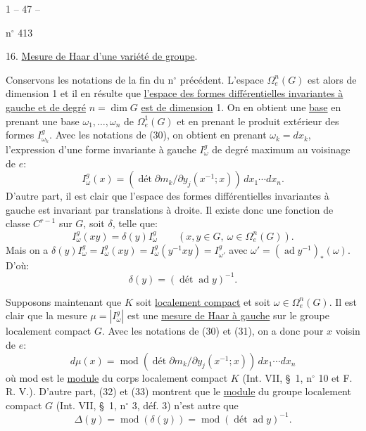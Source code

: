 \begin{center}1 -- 47 --\end{center}\hfill n$^\circ$ 413

16. \uline{Mesure de Haar d'une variété de groupe}.

Conservons les notations de la fin du n$^\circ$ précédent.
L'espace $\Omega_e^n(G)$ est alors de dimension 1 et il en résulte que \uline{l'espace des formes différentielles invariantes à gauche et de degré} $n=\dim G$ \uline{est de dimension} 1.
On en obtient une \uline{base} en prenant une base $\omega_1,\ldots,\omega_n$ de $\Omega_e^1(G)$ et en prenant le produit extérieur des formes $I_{\omega_k}^g$.
Avec les notations de (30), on obtient en prenant $\omega_k=dx_k$, l'expression d'une forme invariante à gauche $I_\omega^g$ de degré maximum au voisinage de $e$:
\[
\tag{31}I_\omega^g(x)=(\operatorname{dét}\partial m_k/\partial y_j(x^{-1};x))\,dx_1\cdots dx_n.
\]
D'autre part, il est clair que l'espace des formes différentielles invariantes à gauche est invariant par translations à droite.
Il existe donc une fonction de classe $C^{r-1}$ sur $G$, soit $\delta$, telle que:
\[
\tag{32}I_\omega^g(xy)=\delta(y)I_\omega^g\qquad(x,y\in G,\ \omega\in\Omega_e^n(G)).
\]
Mais on a $\delta(y)I_\omega^g=I_\omega^g(xy)=I_\omega^g(y^{-1}xy)=I_{\omega'}^g$ avec $\omega'=(\operatorname{ad}y^{-1})_*(\omega)$.
D'où:
\[
\tag{33}\delta(y)=(\operatorname{dét}\operatorname{ad}y)^{-1}.
\]

Supposons maintenant que $K$ soit \uline{localement compact} et soit $\omega\in\Omega_e^n(G)$.
Il est clair que la mesure $\mu=|I_\omega^g|$ est une \uline{mesure de Haar à gauche} sur le groupe localement compact $G$.
Avec les notations de (30) et (31), on a donc pour $x$ voisin de $e$:
\[
\tag{34}d\mu(x)=\operatorname{mod}(\operatorname{dét}\partial m_k/\partial y_j(x^{-1};x))\,dx_1\cdots dx_n
\]
où mod est le \uline{module} du corps localement compact $K$ (Int. VII, \S\ 1, n$^\circ$ 10 et F. R. V.).
D'autre part, (32) et (33) montrent que le \uline{module} du groupe localement compact $G$ (Int. VII, \S\ 1, n$^\circ$ 3, déf. 3) n'est autre que
\[
\tag{35}\Delta(y)=\operatorname{mod}(\delta(y))=\operatorname{mod}(\operatorname{dét}\operatorname{ad}y)^{-1}.
\]

